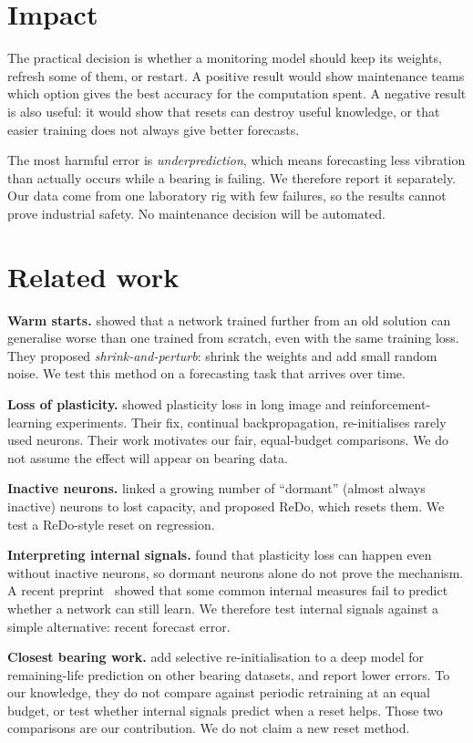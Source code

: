 \documentclass[11pt,twocolumn]{article}
\begin{document}
\section{Impact}
The practical decision is whether a monitoring model should keep its weights, refresh some of them, or restart. A positive result would show maintenance teams which option gives the best accuracy for the computation spent. A negative result is also useful: it would show that resets can destroy useful knowledge, or that easier training does not always give better forecasts.

The most harmful error is \emph{underprediction}, which means forecasting less vibration than actually occurs while a bearing is failing. We therefore report it separately. Our data come from one laboratory rig with few failures, so the results cannot prove industrial safety. No maintenance decision will be automated.

\section{Related work}
\textbf{Warm starts.} \citet{ash2020} showed that a network trained further from an old solution can generalise worse than one trained from scratch, even with the same training loss. They proposed \emph{shrink-and-perturb}: shrink the weights and add small random noise. We test this method on a forecasting task that arrives over time.

\textbf{Loss of plasticity.} \citet{dohare2024} showed plasticity loss in long image and reinforcement-learning experiments. Their fix, continual backpropagation, re-initialises rarely used neurons. Their work motivates our fair, equal-budget comparisons. We do not assume the effect will appear on bearing data.

\textbf{Inactive neurons.} \citet{sokar2023} linked a growing number of ``dormant'' (almost always inactive) neurons to lost capacity, and proposed ReDo, which resets them. We test a ReDo-style reset on regression.

\textbf{Interpreting internal signals.} \citet{lyle2023} found that plasticity loss can happen even without inactive neurons, so dormant neurons alone do not prove the mechanism. A recent preprint~\citep{wang2026} showed that some common internal measures fail to predict whether a network can still learn. We therefore test internal signals against a simple alternative: recent forecast error.

\textbf{Closest bearing work.} \citet{yang2026} add selective re-initialisation to a deep model for remaining-life prediction on other bearing datasets, and report lower errors. To our knowledge, they do not compare against periodic retraining at an equal budget, or test whether internal signals predict when a reset helps. Those two comparisons are our contribution. We do not claim a new reset method.
\end{document}
